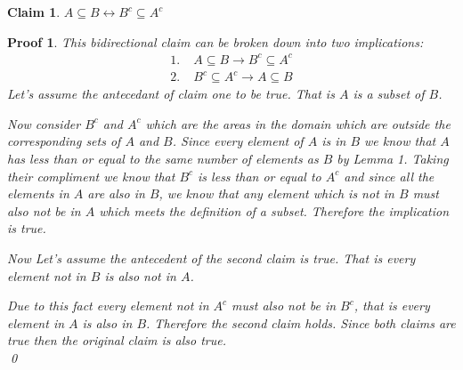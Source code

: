 \documentclass{article}
\newtheorem*{claim}{Claim}
\newtheorem*{poof}{Proof}
\begin{document}
\begin{claim}
    $A \subseteq B \leftrightarrow B^c \subseteq A^c$
\end{claim}
\begin{poof}
    This bidirectional claim can be broken down into two implications:
    \begin{align*}
        1.&\;A\subseteq B \rightarrow B^c\subseteq A^c\\
        2.&\;B^c\subseteq A^c \rightarrow A\subseteq B
    \end{align*}
    Let's assume the antecedant of claim one to be true. That is $A$ is a subset of $B$.
    \begin{figure}[H]
    \centering
    \end{figure}
    Now consider $B^c$ and $A^c$ which are the areas in the domain which are outside the corresponding sets of $A$ and $B$. Since every element of $A$ is in $B$ we know that $A$ has less than or equal to the same number of elements as $B$ by Lemma 1. Taking their compliment we know that $B^c$ is less than or equal to $A^c$ and since all the elements in $A$ are also in $B$, we know that any element which is not in $B$ must also not be in $A$ which meets the definition of a subset. Therefore the implication is true.

    Now Let's assume the antecedent of the second claim is true. That is every element not in $B$ is also not in $A$.
    \begin{figure}[H]
        \centering
        \end{figure}
    Due to this fact every element not in $A^c$ must also not be in $B^c$, that is every element in $A$ is also in $B$. Therefore the second claim holds. Since both claims are true then the original claim is also true. \\
    \qed\end{poof}
\end{document}
